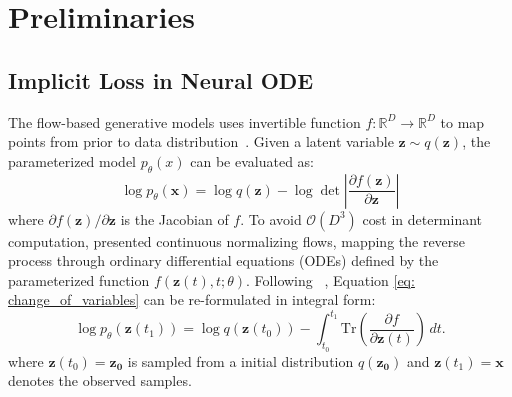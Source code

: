 \section{Preliminaries}
\subsection{Implicit Loss in Neural ODE}
The flow-based generative models uses invertible function $f:\mathbb{R}^D \rightarrow \mathbb{R}^D$ to map points from prior to data distribution~\citep{density_real_NVP, dinh2014nice}. 
Given a latent variable $\mathbf{z}\sim q(\mathbf{z})$, the parameterized model $p_\theta(x)$ can be evaluated as:
\begin{equation}\label{eq: change_of_variables}
    \log p_\theta(\mathbf{x}) = \log q(\mathbf{z}) - \log \det \left| \frac{\partial f(\mathbf{z})}{\partial \mathbf{z}} \right|
\end{equation}
where $\partial f(\mathbf{z}) / \partial \mathbf{z}$ is the Jacobian of $f$.
To avoid $\mathcal{O}(D^3)$ cost in determinant computation, 
\citet{neural_ode} presented continuous normalizing flows, mapping the reverse process through ordinary differential equations (ODEs) defined by the parameterized function $f(\mathbf{z}(t),t;\theta)$. Following 
~\citet{neural_ode}, 
Equation \ref{eq: change_of_variables} can be re-formulated in integral form:
\begin{equation}\label{eq: ode_likelihood}
    \log p_\theta(\mathbf{z}(t_1)) = \log q(\mathbf{z}(t_0)) - \int_{t_0}^{t_1} \mathrm{Tr} \left( \frac{\partial f}{\partial \mathbf{z}(t)} \right) \, dt.
\end{equation}
where $\mathbf{z}(t_0) = \mathbf{z_0}$ is sampled from a  initial distribution $q(\mathbf{z_0})$ and $\mathbf{z}(t_1) = \mathbf{x}$ denotes the observed samples. 

